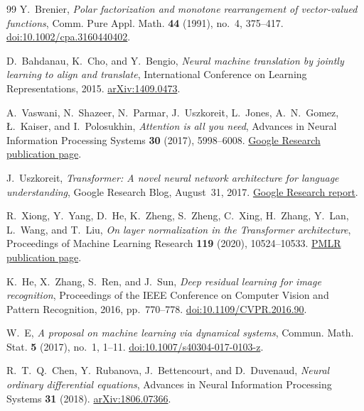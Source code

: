 \documentclass[11pt]{amsart}
\numberwithin{equation}{section}
\theoremstyle{plain}
\begin{document}
\begin{thebibliography}{99}
Y.~Brenier,
\emph{Polar factorization and monotone rearrangement of vector-valued
functions},
Comm. Pure Appl. Math. \textbf{44} (1991), no.~4, 375--417.
\href{https://doi.org/10.1002/cpa.3160440402}
{doi:10.1002/cpa.3160440402}.

D.~Bahdanau, K.~Cho, and Y.~Bengio,
\emph{Neural machine translation by jointly learning to align and translate},
International Conference on Learning Representations, 2015.
\href{https://arxiv.org/abs/1409.0473}{arXiv:1409.0473}.

A.~Vaswani, N.~Shazeer, N.~Parmar, J.~Uszkoreit, L.~Jones, A.~N.~Gomez,
\L.~Kaiser, and I.~Polosukhin,
\emph{Attention is all you need},
Advances in Neural Information Processing Systems \textbf{30} (2017),
5998--6008.
\href{https://research.google/pubs/attention-is-all-you-need/}
{Google Research publication page}.

J.~Uszkoreit,
\emph{Transformer: A novel neural network architecture for language
understanding},
Google Research Blog, August~31, 2017.
\href{https://research.google/blog/transformer-a-novel-neural-network-architecture-for-language-understanding/}
{Google Research report}.

R.~Xiong, Y.~Yang, D.~He, K.~Zheng, S.~Zheng, C.~Xing, H.~Zhang,
Y.~Lan, L.~Wang, and T.~Liu,
\emph{On layer normalization in the Transformer architecture},
Proceedings of Machine Learning Research \textbf{119} (2020), 10524--10533.
\href{https://proceedings.mlr.press/v119/xiong20b.html}
{PMLR publication page}.

K.~He, X.~Zhang, S.~Ren, and J.~Sun,
\emph{Deep residual learning for image recognition},
Proceedings of the IEEE Conference on Computer Vision and Pattern Recognition,
2016, pp.~770--778.
\href{https://doi.org/10.1109/CVPR.2016.90}
{doi:10.1109/CVPR.2016.90}.

W.~E,
\emph{A proposal on machine learning via dynamical systems},
Commun. Math. Stat. \textbf{5} (2017), no.~1, 1--11.
\href{https://doi.org/10.1007/s40304-017-0103-z}
{doi:10.1007/s40304-017-0103-z}.

R.~T.~Q.~Chen, Y.~Rubanova, J.~Bettencourt, and D.~Duvenaud,
\emph{Neural ordinary differential equations},
Advances in Neural Information Processing Systems \textbf{31} (2018).
\href{https://arxiv.org/abs/1806.07366}{arXiv:1806.07366}.


\end{thebibliography}
\end{document}
